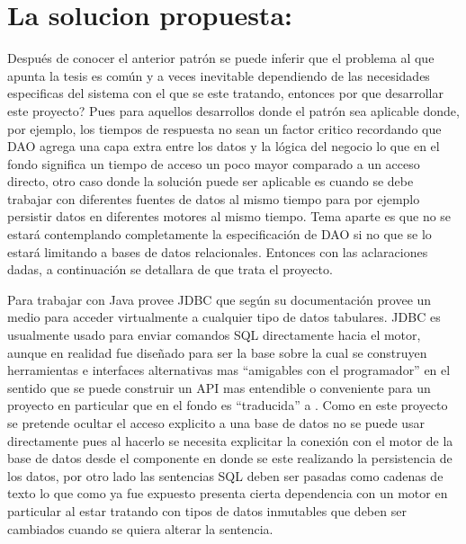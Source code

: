 \section{La solucion propuesta: \jj}
Después de conocer el anterior patrón se puede inferir que el problema al que apunta la tesis es común y a veces inevitable dependiendo de las necesidades especificas del sistema con el que se este tratando, entonces por que desarrollar este proyecto? Pues para aquellos desarrollos donde el patrón sea aplicable donde, por ejemplo, los tiempos de respuesta no sean un factor critico recordando que DAO agrega una capa extra entre los datos y la lógica del negocio lo que en el fondo significa un tiempo de acceso un poco mayor comparado a un acceso directo, otro caso donde la solución puede ser aplicable es cuando se debe trabajar con diferentes fuentes de datos al mismo tiempo para por ejemplo persistir datos en diferentes motores al mismo tiempo. Tema aparte es que no se estará contemplando completamente la especificación de DAO si no que se lo estará limitando a bases de datos relacionales. Entonces con las aclaraciones dadas, a continuación se detallara de que trata el proyecto.

Para trabajar con \dd Java provee JDBC\cite{java:jdbc} que según su documentación provee un medio para acceder virtualmente a cualquier tipo de datos tabulares. JDBC es usualmente usado para enviar comandos SQL directamente hacia el motor, aunque en realidad fue diseñado para ser la base sobre la cual se construyen herramientas e interfaces alternativas mas ``amigables con el programador'' en el sentido que se puede construir un API mas entendible o conveniente para un proyecto en particular que en el fondo es ``traducida'' a \jd. Como en este proyecto se pretende ocultar el acceso explicito a una base de datos no se puede usar directamente \jd pues al hacerlo se necesita explicitar la conexión con el motor de la base de datos desde el componente en donde se este realizando la persistencia de los datos, por otro lado las sentencias SQL deben ser pasadas como cadenas de texto lo que como ya fue expuesto presenta cierta dependencia con un motor en particular al estar tratando con tipos de datos inmutables que deben ser cambiados cuando se quiera alterar la sentencia.

